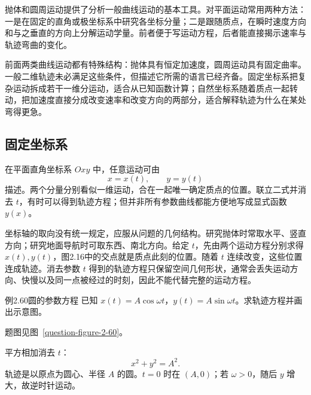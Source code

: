 
抛体和圆周运动提供了分析一般曲线运动的基本工具。对平面运动常用两种方法：一是在固定的直角或极坐标系中研究各坐标分量；二是跟随质点，在瞬时速度方向和与之垂直的方向上分解运动学量。前者便于写运动方程，后者能直接揭示速率与轨迹弯曲的变化。

前面两类曲线运动都有特殊结构：抛体具有恒定加速度，圆周运动具有固定曲率。一般二维轨迹未必满足这些条件，但描述它所需的语言已经齐备。固定坐标系把复杂运动拆成若干一维分运动，适合从已知函数计算；自然坐标系随着质点一起转动，把加速度直接分成改变速率和改变方向的两部分，适合解释轨迹为什么在某处弯得更急。

\subsection{固定坐标系}

\FixedCoordinatesDiagram

在平面直角坐标系 $Oxy$ 中，任意运动可由
\begin{equation}
 x=x(t),\qquad y=y(t)
\end{equation}
描述。两个分量分别看似一维运动，合在一起唯一确定质点的位置。联立二式并消去 $t$，有时可以得到轨迹方程；但并非所有参数曲线都能方便地写成显式函数 $y(x)$。

坐标轴的取向没有统一规定，应服从问题的几何结构。研究抛体时常取水平、竖直方向；研究地面导航时可取东西、南北方向。给定 $t$，先由两个运动方程分别求得 $x(t),y(t)$，图2.16中的交点就是质点此刻的位置。随着 $t$ 连续改变，这些位置连成轨迹。消去参数 $t$ 得到的轨迹方程只保留空间几何形状，通常会丢失运动方向、快慢以及同一点被经过的时刻，因此不能代替完整的运动方程。

\ifdefined\Needspace{}\fi
\begin{origexamplebox}{例2.60\quad 圆的参数方程}
已知 $x(t)=A\cos\omega t$，$y(t)=A\sin\omega t$。求轨迹方程并画出示意图。
\par 题图见图~\ref{question-figure-2-60}。
\KQuestionCI
\end{origexamplebox}
\begin{xesolution}
平方相加消去 $t$：
\[
 \boxed{x^2+y^2=A^2}.
\]
轨迹是以原点为圆心、半径 $A$ 的圆。$t=0$ 时在 $(A,0)$；若 $\omega>0$，随后 $y$ 增大，故逆时针运动。
\begin{center}\end{center}
\end{xesolution}

